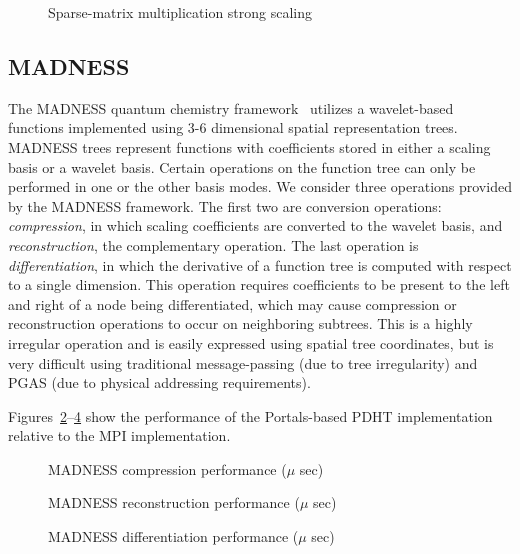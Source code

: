 \begin{figure}[ht]
  \center
  \fbox{\rule{2.5in}{0pt}\rule[-2.5in]{0pt}{4ex}}  
  \caption{Sparse-matrix multiplication strong scaling}
  \label{fig:5}
\end{figure}



\subsection{MADNESS}

The MADNESS quantum chemistry framework~\cite{thornton09} utilizes a
wavelet-based functions implemented using 3-6 dimensional spatial
representation trees. MADNESS trees represent functions with 
coefficients stored in either a scaling basis or a wavelet basis.
Certain operations on the function tree can only be performed in
one or the other basis modes. We consider three operations
provided by the MADNESS framework. The first two are conversion
operations: {\em compression}, in which scaling coefficients
are converted to the wavelet basis, and {\em reconstruction}, 
the complementary operation. The last operation is {\em differentiation},
in which the derivative of a function tree is computed with respect
to a single dimension. This operation requires coefficients 
to be present to the left and right of a node being differentiated,
which may cause compression or reconstruction operations to 
occur on neighboring subtrees. This is a highly irregular operation
and is easily expressed using spatial tree coordinates, but is
very difficult using traditional message-passing (due to tree
irregularity) and PGAS (due to physical addressing requirements).

Figures~\ref{fig:1}--\ref{fig:3} show the performance of the
Portals-based PDHT implementation relative to the MPI implementation.

\begin{figure}[ht]
  \center
  \fbox{\rule{2.5in}{0pt}\rule[-2.5in]{0pt}{4ex}}  
  \caption{MADNESS compression performance ($\mu$ sec)}
  \label{fig:1}
\end{figure}

\begin{figure}[ht]
  \center
  \fbox{\rule{2.5in}{0pt}\rule[-2.5in]{0pt}{4ex}}  
  \caption{MADNESS reconstruction performance ($\mu$ sec)}
  \label{fig:2}
\end{figure}

\begin{figure}[ht]
  \center
  \fbox{\rule{2.5in}{0pt}\rule[-2.5in]{0pt}{4ex}}  
  \caption{MADNESS differentiation performance ($\mu$ sec)}
  \label{fig:3}
\end{figure}


